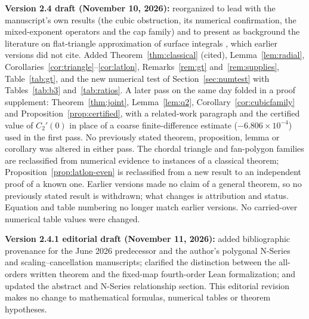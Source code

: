 \documentclass[11pt]{article}
\theoremstyle{remark}
\begin{document}
\textbf{Version 2.4 draft (November 10, 2026):} reorganized to lead with the manuscript's own
results (the cubic obstruction, its numerical confirmation, the mixed-exponent operators and
the cap family) and to present as background the literature on
flat-triangle approximation of surface integrals
\cite{georg91,georgtausch,verlindencools,lyness94}, which earlier versions did not cite.
Added Theorem~\ref{thm:classical} (cited), Lemma~\ref{lem:radial},
Corollaries~\ref{cor:triangle}--\ref{cor:latlon}, Remarks~\ref{rem:gt} and~\ref{rem:supplies},
Table~\ref{tab:gt}, and the new numerical test of Section~\ref{sec:numtest} with
Tables~\ref{tab:b3} and~\ref{tab:ratios}. A later pass on the same day folded in a proof supplement:
Theorem~\ref{thm:joint}, Lemma~\ref{lem:q2}, Corollary~\ref{cor:cubicfamily} and
Proposition~\ref{prop:certified}, with a related-work paragraph and the certified value of
$C_2'(0)$ in place of a coarse finite-difference estimate ($-6.806\times10^{-4}$) used in the
first pass. No previously stated theorem, proposition, lemma or corollary was altered in
either pass. The chordal triangle and fan-polygon families are reclassified from
numerical evidence to instances of a classical theorem; Proposition~\ref{prop:latlon-even} is
reclassified from a new result to an independent proof of a known one. Earlier versions made
no claim of a general theorem, so no previously stated result is withdrawn; what changes is
attribution and status. Equation and table numbering no longer match earlier versions. No
carried-over numerical table values were changed.

\textbf{Version 2.4.1 editorial draft (November 11, 2026):}
added bibliographic provenance for the June 2026 predecessor and the
author's polygonal N-Series and scaling--cancellation manuscripts;
clarified the distinction between the all-orders written theorem and the
fixed-map fourth-order Lean formalization; and updated the abstract and
N-Series relationship section. This editorial revision makes no change
to mathematical formulas, numerical tables or theorem hypotheses.
\end{document}
